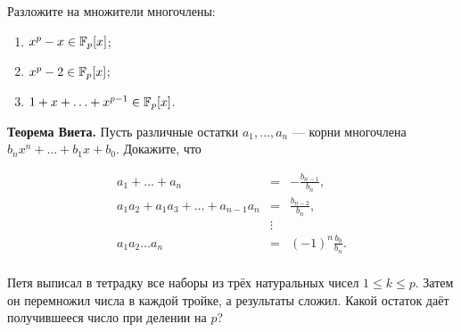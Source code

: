 \documentclass{article}
\begin{document}
\begin{enumerate_boxed}
        \item  Разложите на множители многочлены:
        \begin{enumerate}
            \item $x^p - x \in \mathbb{F}_p[x]$;
            \item $x^{p} - 2 \in \mathbb{F}_p[x]$;
            \item $1 + x + \ldots + x^{p-1} \in \mathbb{F}_p[x]$.
        \end{enumerate}

        \item \textbf{Теорема Виета.} Пусть различные остатки $a_1, \ldots, a_n$ — корни многочлена $b_n x^n + \ldots + b_1 x + b_0$.
        Докажите, что

        \begin{eqnarray*}
            a_1 + \ldots + a_n &=& - \frac{b_{n-1}}{b_n},\\
            a_1 a_2 + a_1 a_3 + \ldots + a_{n-1} a_n &=& \frac{b_{n-2}}{b_n},\\
            &\vdots&\\
            a_1 a_2 \ldots a_n &=& (-1)^n \frac{b_0}{b_n}.\\
        \end{eqnarray*}

        \item Петя выписал в тетрадку все наборы из трёх натуральных чисел $1 \leq k \leq p$.
        Затем он перемножил числа в каждой тройке, а результаты сложил.
        Какой остаток даёт получившееся число при делении на $p$?

    \end{enumerate_boxed}
\end{document}
